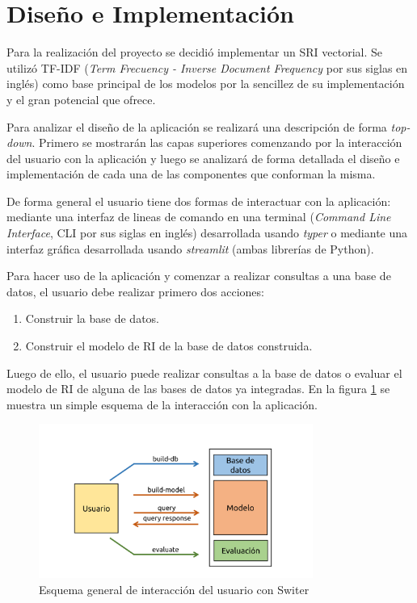 \section{Diseño e Implementación}\label{sec:design}

Para la realización del proyecto se decidió implementar un SRI vectorial. Se
utilizó TF-IDF (\emph{Term Frecuency - Inverse Document Frequency} por sus
siglas en inglés) como base principal de los modelos por la sencillez de su
implementación y el gran potencial que ofrece.

Para analizar el diseño de la aplicación se realizará una descripción de forma
\emph{top-down}. Primero se mostrarán las capas superiores comenzando por la
interacción del usuario con la aplicación y luego se analizará de forma
detallada el diseño e implementación de cada una de las componentes que
conforman la misma.

De forma general el usuario tiene dos formas de interactuar con la aplicación:
mediante una interfaz de lineas de comando en una terminal (\emph{Command Line
Interface}, CLI por sus siglas en inglés) desarrollada usando \emph{typer} o
mediante una interfaz gráfica desarrollada usando \emph{streamlit} (ambas
librerías de Python).

Para hacer uso de la aplicación y comenzar a realizar consultas a una base de
datos, el usuario debe realizar primero dos acciones:

\begin{enumerate}
	\item Construir la base de datos.
	\item Construir el modelo de RI de la base de datos construida.
\end{enumerate}

Luego de ello, el usuario puede realizar consultas a la base de datos o
evaluar el modelo de RI de alguna de las bases de datos ya integradas. En
la figura \ref{fig:interaction} se muestra un simple esquema de la
interacción con la aplicación.

\begin{figure}[htb]%
	\begin{center}
		\includegraphics[width=0.8\textwidth]{./sri_01.png}
	\end{center}
	\caption{Esquema general de interacción del usuario con Switer}
	\label{fig:interaction}
\end{figure}

